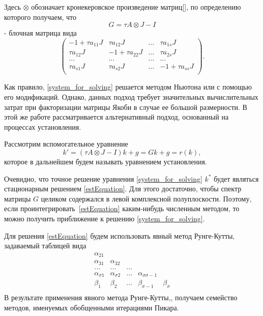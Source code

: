 \documentclass[a4paper,14pt]{extreport}
\begin{document}
Здесь $\otimes$ обозначает кронекеровское произведение матриц[], по
определению которого получаем, что $$G=\tau A\otimes J-I$$ - блочная
матрица вида
	\begin{equation}
	\left(
	\begin{array}{llll}
	-1+\tau a_{11}J& \tau a_{12}J&...&\tau a_{1s}J\\
 	\tau a_{12}J&-1+\tau a_{22}J&...&\tau a_{2s}J\\
	...&...&...&...\\
	\tau a_{s1}J& \tau a_{s2}J&...&-1+\tau a_{ss}J\\
	\end{array}
	\right ).
	\end{equation}
	
Как правило, \eqref{system_for_solving} решается методом Ньютона или с помощью его модификаций. Однако, данных подход требует значительных вычислительных затрат при факторизации матрицы Якоби в случае ее большой размерности. В этой же работе рассматривается альтернативный подход, основанный на процессах установления\cite{Bondar Faleichik Parall}.
	
 
Рассмотрим вспомогательное уравнение
	\begin{equation}
	\label{estEquation}
	k'=(\tau A\otimes J-I)k+g=Gk+g = r(k),
	\end{equation}
которое в дальнейшем будем называть уравнением установления.

Очевидно, что точное решение уравнения \eqref{system_for_solving} $k^*$ будет являться стационарным решением \eqref{estEquation}. Для этого достаточно, чтобы спектр матрицы $G$ целиком содержался в левой комплексной полуплоскости. Поэтому, если проинтегрировать~\eqref{estEquation}  каким-нибудь численным методом, то можно получить приближение к решению \eqref{system_for_solving}.

Для решения \eqref{estEquation} будем использовать явный метод Рунге-Кутты, задаваемый таблицей вида
	\begin{equation}
	\label{auxilary_method_table}
	\begin{array}{lllll}
	 \alpha_{21}& & & &  \\
	 \alpha_{31}&\alpha_{32} & & &  \\
	 ...& ...& ...& &\\
	 \alpha_{\sigma1}& \alpha_{\sigma2}&... &\alpha_{\sigma\sigma-1}&  \\
	\hline
	 \beta_1&\beta_2 &...&\beta_{\sigma-1}& \beta_\sigma\\
	\end{array}
	\end{equation}
В результате применения явного метода Рунге-Кутты,, получаем семейство методов, именуемых обобщенными итерациями Пикара. 
	
\end{document}
